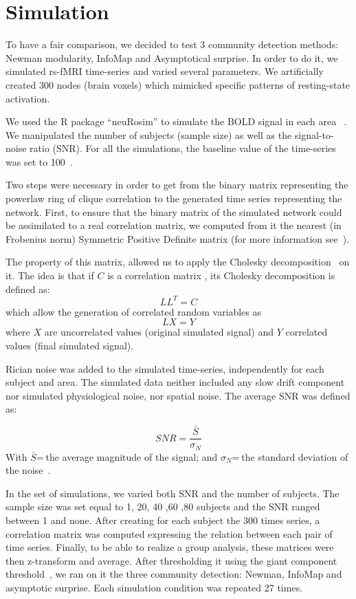 \section{Simulation}
To have a fair comparison, we decided to test 3 community detection methods: Newman modularity, InfoMap and Asymptotical surprise. In order to do it, we simulated rs-fMRI time-series and varied several parameters. We artificially created 300 nodes (brain voxels) which mimicked specific patterns of resting-state activation. 

We used the R package “neuRosim” to simulate the BOLD signal in each area ~\cite{Welvaert2011}. We manipulated the number of subjects (sample size) as well as the signal-to-noise ratio (SNR). For all the simulations, the baseline value of the time-series was set to 100~\cite{Welvaert2013}.

Two steps were necessary in order to get from the binary matrix representing the powerlaw ring of clique correlation to the generated time series representing the network. First, to ensure that the binary matrix of the simulated network  could be assimilated to a real correlation matrix, we computed from it the nearest (in Frobenius norm) Symmetric Positive Definite matrix (for more information see~\cite{Higham1988}).

The property of this matrix, allowed us to apply the Cholesky decomposition~\cite{Pourahmadi1999} on it.
The idea is that if $C$ is a correlation matrix , its Cholesky decomposition is defined as:
\begin{equation}
LL^T=C
\end{equation}
which allow the generation of correlated random variables as
\begin{equation}
LX=Y
\end{equation}
where $X$ are uncorrelated values (original simulated signal) and $Y$ correlated values (final simulated signal). 

Rician noise was added to the simulated time-series, independently for each subject and area. The simulated data neither included any slow drift component nor simulated physiological noise, nor spatial noise. The average SNR was defined as:

\begin{equation}
SNR=\frac{\bar{S}}{\sigma_N}
\end{equation}
With $\bar{S}$= the average magnitude of the signal; and $\sigma_N$= the standard deviation of the noise~\cite{Kruger2011}.


In the set of simulations, we varied both SNR and the number of subjects. The sample size was set equal to 1, 20, 40 ,60 ,80 subjects and the SNR ranged between 1 and none. 
After creating for each subject the 300 times series, a correlation matrix was computed expressing the relation between each pair of time series. Finally, to be able to realize a group analysis, these matrices were then z-transform and average. After thresholding it using the giant component threshold~\cite{Goerdt2001}, we ran on it the three community detection: Newman, InfoMap and asymptotic surprise.
Each simulation condition was repeated 27 times. 

